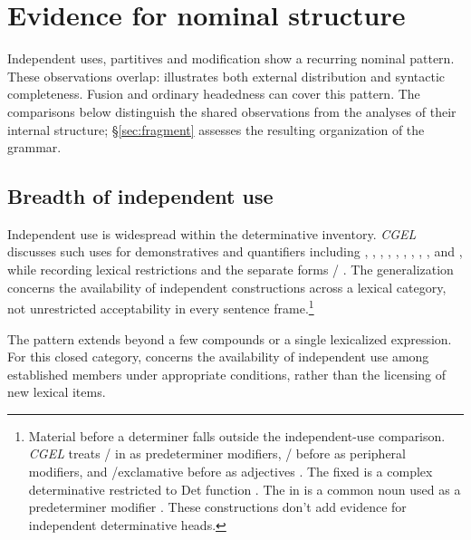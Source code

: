 \documentclass[12pt]{article}
\begin{document}
\section{Evidence for nominal structure}\label{sec:evidence}

Independent uses, partitives and modification show a recurring nominal pattern. These observations overlap:  illustrates both external distribution and syntactic completeness. Fusion and ordinary headedness can cover this pattern. The comparisons below distinguish the shared observations from the analyses of their internal structure; §\ref{sec:fragment} assesses the resulting organization of the grammar.

\subsection{Breadth of independent use}\label{sec:independent}

Independent use is widespread within the determinative inventory. \textit{CGEL} discusses such uses for demonstratives and quantifiers including , , , , , , , , ,  and , while recording lexical restrictions and the separate forms / \citep[371--372, 410--424]{huddleston2002}. The generalization concerns the availability of independent constructions across a lexical category, not unrestricted acceptability in every sentence frame.\footnote{Material before a determiner falls outside the independent-use comparison. \textit{CGEL} treats / in  as predeterminer modifiers, / before  as peripheral modifiers, and /exclamative  before  as adjectives \citep[433--437]{huddleston2002}. The fixed  is a complex determinative restricted to Det function \citep[394]{huddleston2002}. The  in  is a common noun used as a predeterminer modifier \citep[434]{huddleston2002}. These constructions don't add evidence for independent determinative heads.}

The pattern extends beyond a few compounds or a single lexicalized expression. For this closed category,  concerns the availability of independent use among established members under appropriate conditions, rather than the licensing of new lexical items.
\end{document}
